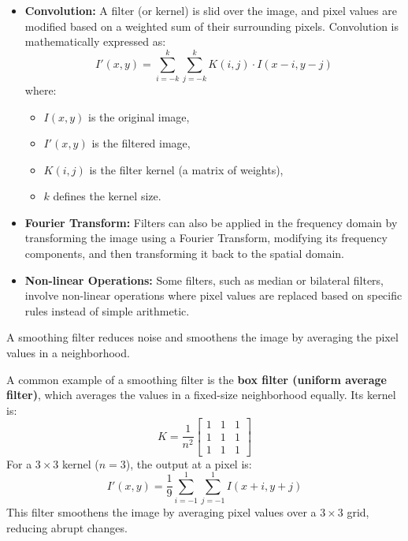 \documentclass[12pt]{article}
\begin{document}
\begin{enumerate}
          \begin{itemize}
              \item \textbf{Convolution:} A filter (or kernel) is slid over the image, and pixel values are modified based on a weighted sum of their surrounding pixels. Convolution is mathematically expressed as:
                    \[
                        I'(x, y) = \sum_{i=-k}^{k} \sum_{j=-k}^{k} K(i, j) \cdot I(x-i, y-j)
                    \]
                    where:
                    \begin{itemize}
                        \item \(I(x, y)\) is the original image,
                        \item \(I'(x, y)\) is the filtered image,
                        \item \(K(i, j)\) is the filter kernel (a matrix of weights),
                        \item \(k\) defines the kernel size.
                    \end{itemize}

              \item \textbf{Fourier Transform:} Filters can also be applied in the frequency domain by transforming the image using a Fourier Transform, modifying its frequency components, and then transforming it back to the spatial domain.

              \item \textbf{Non-linear Operations:} Some filters, such as median or bilateral filters, involve non-linear operations where pixel values are replaced based on specific rules instead of simple arithmetic.
          \end{itemize}

          A smoothing filter reduces noise and smoothens the image by averaging the pixel values in a neighborhood.

          A common example of a smoothing filter is the \textbf{box filter (uniform average filter)}, which averages the values in a fixed-size neighborhood equally. Its kernel is:
          \[
              K = \frac{1}{n^2}
              \begin{bmatrix}
                  1 & 1 & 1 \\
                  1 & 1 & 1 \\
                  1 & 1 & 1
              \end{bmatrix}
          \]
          For a \(3 \times 3\) kernel (\(n=3\)), the output at a pixel is:
          \[
              I'(x, y) = \frac{1}{9} \sum_{i=-1}^{1} \sum_{j=-1}^{1} I(x+i, y+j)
          \]
          This filter smoothens the image by averaging pixel values over a \(3 \times 3\) grid, reducing abrupt changes.


\end{enumerate}
\end{document}
